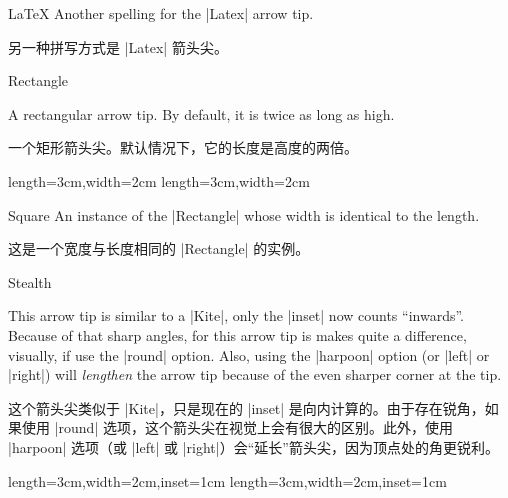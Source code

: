 \begin{arrowtipsimple}{LaTeX}
    Another spelling for the |Latex| arrow tip.

    另一种拼写方式是 |Latex| 箭头尖。


\end{arrowtipsimple}

\begin{arrowtip}{Rectangle}{
    A rectangular arrow tip. By default, it is twice as long as high.

    一个矩形箭头尖。默认情况下，它的长度是高度的两倍。
}%
{length=3cm,width=2cm}%
{length=3cm,width=2cm}

    \begin{arrowexamples}
        \arrowexample[]
        \arrowexampledup[sep]
        \arrowexampledupdot[sep]
        \arrowexample[open]
        \arrowexample[length=4pt]
        \arrowexample[round]
        \arrowexample[slant=.3]
        \arrowexample[left]
        \arrowexample[right]
        \arrowexample[red]
    \end{arrowexamples}
\end{arrowtip}

\begin{arrowtipsimple}{Square}
    An instance of the |Rectangle| whose width is identical to the length.

    这是一个宽度与长度相同的 |Rectangle| 的实例。


    \begin{arrowexamples}
        \arrowexample[]
        \arrowexampledup[sep]
        \arrowexampledupdot[sep]
        \arrowexample[open]
        \arrowexample[length=4pt]
        \arrowexample[round]
        \arrowexample[slant=.3]
        \arrowexample[left]
        \arrowexample[right]
        \arrowexample[red]
    \end{arrowexamples}
\end{arrowtipsimple}

\begin{arrowtip}{Stealth}{
    This arrow tip is similar to a |Kite|, only the |inset| now counts
    ``inwards''. Because of that sharp angles, for this arrow tip is makes
    quite a difference, visually, if use the |round| option. Also, using the
    |harpoon| option (or |left| or |right|) will \emph{lengthen} the arrow tip
    because of the even sharper corner at the tip.

    这个箭头尖类似于 |Kite|，只是现在的 |inset| 是向内计算的。由于存在锐角，如果使用 |round| 选项，这个箭头尖在视觉上会有很大的区别。此外，使用 |harpoon| 选项（或 |left| 或 |right|）会“延长”箭头尖，因为顶点处的角更锐利。
}%
{length=3cm,width=2cm,inset=1cm}%
{length=3cm,width=2cm,inset=1cm}

    \begin{arrowexamples}
        \arrowexample[]
        \arrowexampledup[sep]
        \arrowexampledupdot[sep]
        \arrowexample[open]
        \arrowexample[length=6pt,width=4pt]
        \arrowexample[length=6pt,width=4pt,inset=1.5pt]
        \arrowexample[round]
        \arrowexample[slant=.3]
        \arrowexample[left]
        \arrowexample[right]
        \arrowexample[red]
    \end{arrowexamples}
\end{arrowtip}

